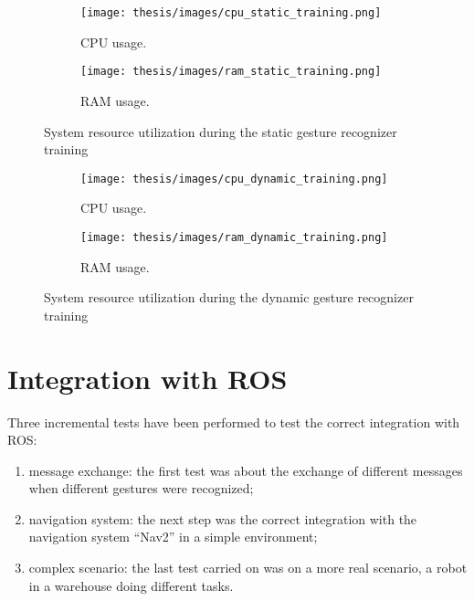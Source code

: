 \documentclass[../thesis.tex]{subfiles}
\begin{document}
\begin{figure}[H]
    \centering
    \begin{subfigure}[b]{0.45\textwidth}
        \centering
        \texttt{[image: thesis/images/cpu\_static\_training.png]}
        \caption{CPU usage.}
        \label{fig:cpu_usage_static_training}
    \end{subfigure}
    \hfill
    \begin{subfigure}[b]{0.45\textwidth}
        \centering
        \texttt{[image: thesis/images/ram\_static\_training.png]}
        \caption{RAM usage.}
        \label{fig:ram_usage_static_training}
    \end{subfigure}
    \caption{System resource utilization during the static gesture recognizer training}
    \label{fig:system_resource_graphs_static_training}
\end{figure}

\begin{figure}[H]
    \centering
    \begin{subfigure}[b]{0.45\textwidth}
        \centering
        \texttt{[image: thesis/images/cpu\_dynamic\_training.png]}
        \caption{CPU usage.}
        \label{fig:cpu_usage_dynamic_training}
    \end{subfigure}
    \hfill
    \begin{subfigure}[b]{0.45\textwidth}
        \centering
        \texttt{[image: thesis/images/ram\_dynamic\_training.png]}
        \caption{RAM usage.}
        \label{fig:ram_usage_dynamic_training}
    \end{subfigure}
    \caption{System resource utilization during the dynamic gesture recognizer training}
    \label{fig:system_resource_graphs_dynamic_training}
\end{figure}

\section{Integration with ROS}
Three incremental tests have been performed to test the correct integration with \gls{ROS}:
\begin{enumerate}
    \item message exchange: the first test was about the exchange of different messages when different gestures were recognized;
    \item navigation system: the next step was the correct integration with the navigation system ``Nav2'' in a simple environment;
    \item complex scenario: the last test carried on was on a more real scenario, a robot in a warehouse doing different tasks.
\end{enumerate}
\end{document}
